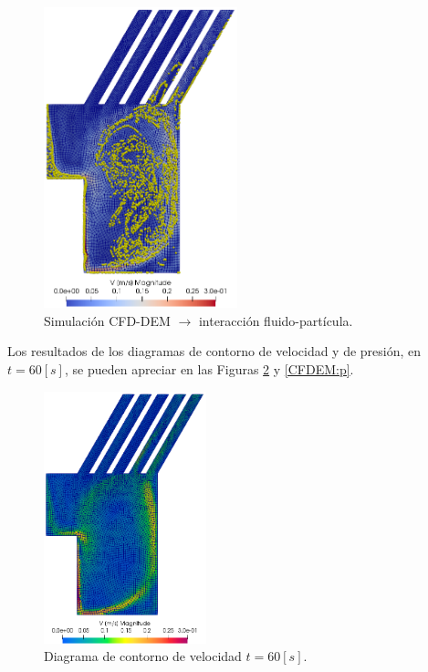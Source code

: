 \begin{figure}[h!]
	\centering
	\includegraphics[width=0.5\textwidth]{Images/CFDEM/simu1.png}
	\caption{Simulaci\'on CFD-DEM $\rightarrow$ interacci\'on fluido-part\'icula.}
	\label{CFDEM:fpart}
\end{figure}

\noindent
\justify

Los resultados de los diagramas de contorno de velocidad y de presi\'on, en $t = 60 [s]$, se pueden apreciar en las Figuras \ref{CFDEM:vel} y \ref{CFDEM:p}.

\begin{figure}[h!]
	\centering
	\includegraphics[width=0.42\textwidth]{Images/CFDEM/vel.png}
	\caption{Diagrama de contorno de velocidad $t = 60 [s]$.}
	\label{CFDEM:vel}
\end{figure}

